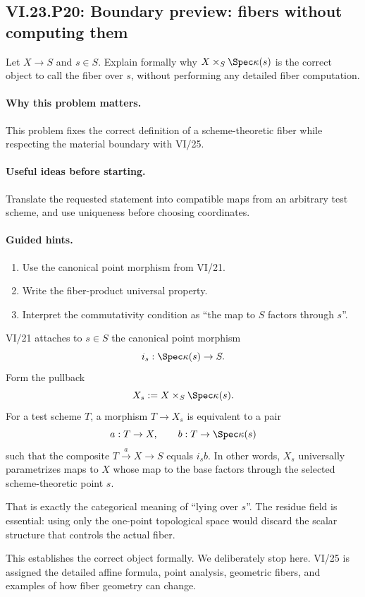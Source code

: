 \subsection*{VI.23.P20: Boundary preview: fibers without computing them}
\begin{problem}\label{prob:vi23-p20}
Let $X\to S$ and $s\in S$. Explain formally why
$X\times_S\Spec\kappa(s)$ is the correct object to call the fiber over $s$, without performing
any detailed fiber computation.
\end{problem}

\ifdefined\FullProblemDossiers
\paragraph{Why this problem matters.}
This problem fixes the correct definition of a scheme-theoretic fiber while respecting the material boundary with VI/25.

\paragraph{Useful ideas before starting.}
Translate the requested statement into compatible maps from an arbitrary test scheme, and use uniqueness before choosing coordinates.

\paragraph{Guided hints.}
\begin{enumerate}
\item Use the canonical point morphism from VI/21.
\item Write the fiber-product universal property.
\item Interpret the commutativity condition as ``the map to $S$ factors through $s$''.
\end{enumerate}

\begin{solution}
VI/21 attaches to $s\in S$ the canonical point morphism
\[
i_s:\Spec\kappa(s)\to S.
\]
Form the pullback
\[
X_s:=X\times_S\Spec\kappa(s).
\]
For a test scheme $T$, a morphism $T\to X_s$ is equivalent to a pair
\[
a:T\to X,\qquad b:T\to\Spec\kappa(s)
\]
such that the composite $T\xrightarrow aX\to S$ equals $i_s b$.  In other words, $X_s$
universally parametrizes maps to $X$ whose map to the base factors through the selected
scheme-theoretic point $s$.

That is exactly the categorical meaning of ``lying over $s$''.  The residue field is essential:
using only the one-point topological space would discard the scalar structure that controls the
actual fiber.

This establishes the correct object formally.  We deliberately stop here.  VI/25 is assigned the
detailed affine formula, point analysis, geometric fibers, and examples of how fiber geometry can
change.
\end{solution}

